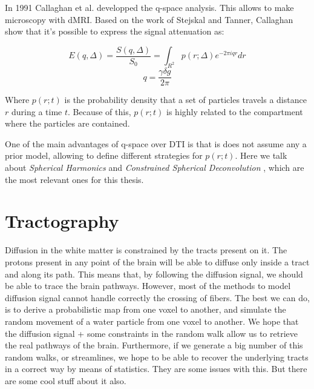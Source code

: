 In 1991 Callaghan et al. \cite{Callaghan1991} developped the q-space analysis.
This allows to make microscopy with dMRI.
Based on the work of Stejskal and Tanner, Callaghan show that it's possible to express the signal attenuation as:

$$E(q,\Delta) =  \frac{S(q,\Delta)}{S_0} = \int_{R^2}{p(r;\Delta)e^{-2\pi i q r} dr} $$
$$ q = \frac{\gamma \delta g}{2\pi} $$

Where $p(r;t)$  is the probability density that a set of particles travels a distance $r$ during a time $t$.
Because of this, $p(r;t)$ is highly related to the compartment where the particles are contained.

One of the main advantages of q-space over DTI is that is does not assume any a prior model, allowing to define different strategies for $p(r;t)$.
Here we talk about \textit{Spherical Harmonics} \cite{Tuch2004} and
\textit{Constrained Spherical Deconvolution} \cite{Tournier2004}, which are the most relevant ones for this thesis.

\section{Tractography}


Diffusion in the white matter is constrained by the tracts present on it.
The protons present in any point of the brain will be able to diffuse only inside a tract and along its path.
This means that, by following the diffusion signal, we should be able to trace the brain pathways.
However, most of the methods to model diffusion signal cannot handle correctly the crossing of fibers.
The best we can do, is to derive a probabilistic map from one voxel to another, and simulate the random movement of a water particle from one voxel to another.
We hope that the diffusion signal + some constraints in the random walk allow us to retrieve the real pathways of the brain.
Furthermore, if we generate a big number of this random walks, or streamlines, we hope to be able to recover the underlying tracts in a correct way by means of statistics.
They are some issues with this.
But there are some cool stuff about it also.

